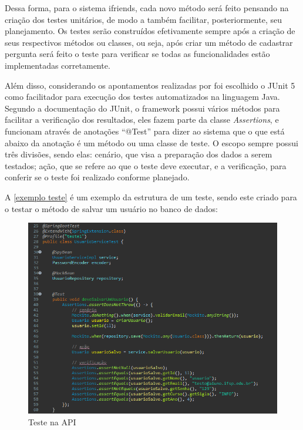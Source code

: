 Dessa forma, para o sistema \gls{ifriends}, cada novo método será feito pensando na criação dos testes unitários, de modo a também facilitar, posteriormente, seu planejamento. Os testes serão construídos efetivamente sempre após a criação de seus respectivos métodos ou classes, ou seja, após criar um método de cadastrar pergunta será feito o teste para verificar se todas as funcionalidades estão implementadas corretamente.

Além disso, considerando os apontamentos realizadas por  foi escolhido o \gls{JUnit} 5 como facilitador para execução dos testes automatizados na linguagem Java. Segundo a documentação do \gls{JUnit}, o \gls{framework} possui vários métodos para facilitar a verificação dos resultados, eles fazem parte da classe \textit{Assertions}, e funcionam através de anotações ``@Test'' para dizer ao sistema que o que está abaixo da anotação é um método ou uma classe de teste. O escopo sempre possui três divisões, sendo elas: cenário, que visa a preparação dos dados a serem testados; ação, que se refere ao que o teste deve executar, e a verificação, para conferir se o teste foi realizado conforme planejado.

A \autoref{exemplo teste} é um exemplo da estrutura de um teste, sendo este criado para o testar o método de salvar um usuário no banco de dados:

\begin{figure}[htb]
\centering
\caption{\label{exemplo teste} Teste na API}
\includegraphics[width=1\textwidth]{anexos/Imagens_Testes/API_teste.png}
\end{figure}
\FloatBarrier

